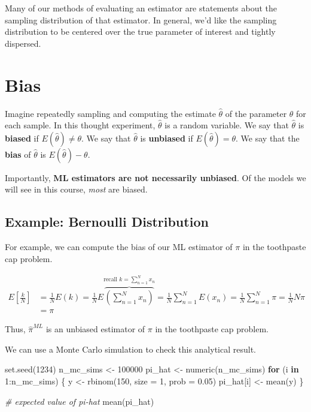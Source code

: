 \documentclass[
]{book}
\newenvironment{Shaded}{\begin{snugshade}}{\end{snugshade}}
\newcommand{\AttributeTok}[1]{\textcolor[rgb]{0.77,0.63,0.00}{#1}}
\newcommand{\CommentTok}[1]{\textcolor[rgb]{0.56,0.35,0.01}{\textit{#1}}}
\newcommand{\ControlFlowTok}[1]{\textcolor[rgb]{0.13,0.29,0.53}{\textbf{#1}}}
\newcommand{\DecValTok}[1]{\textcolor[rgb]{0.00,0.00,0.81}{#1}}
\newcommand{\FloatTok}[1]{\textcolor[rgb]{0.00,0.00,0.81}{#1}}
\newcommand{\FunctionTok}[1]{\textcolor[rgb]{0.00,0.00,0.00}{#1}}
\newcommand{\NormalTok}[1]{#1}
\newcommand{\OtherTok}[1]{\textcolor[rgb]{0.56,0.35,0.01}{#1}}
\newcommand{\SpecialCharTok}[1]{\textcolor[rgb]{0.00,0.00,0.00}{#1}}
\begin{document}
Many of our methods of evaluating an estimator are statements about the
sampling distribution of that estimator. In general, we'd like the
sampling distribution to be centered over the true parameter of interest
and tightly dispersed.

\hypertarget{bias}{%
\section{Bias}\label{bias}}

Imagine repeatedly sampling and computing the estimate \(\hat{\theta}\)
of the parameter \(\theta\) for each sample. In this thought experiment,
\(\hat{\theta}\) is a random variable. We say that \(\hat{\theta}\) is
\textbf{biased} if \(E(\hat{\theta}) \neq \theta\). We say that
\(\hat{\theta}\) is \textbf{unbiased} if \(E(\hat{\theta}) = \theta\).
We say that the \textbf{bias} of \(\hat{\theta}\) is
\(E(\hat{\theta}) - \theta\).

Importantly, \textbf{ML estimators are not necessarily unbiased}. Of the
models we will see in this course, \emph{most} are biased.

\hypertarget{example-bernoulli-distribution-1}{%
\subsection{Example: Bernoulli
Distribution}\label{example-bernoulli-distribution-1}}

For example, we can compute the bias of our ML estimator of \(\pi\) in
the toothpaste cap problem.

\[
\begin{aligned}
E\left[ \frac{k}{N}\right] &= \frac{1}{N} E(k) = \frac{1}{N} E  \overbrace{ \left( \sum_{n = 1}^N x_n \right) }^{\text{recall } k = \sum_{n = 1}^N x_n } = \frac{1}{N} \sum_{n = 1}^N E(x_n) = \frac{1}{N} \sum_{n = 1}^N \pi = \frac{1}{N}N\pi \\
&= \pi
\end{aligned}
\]

Thus, \(\hat{\pi}^{ML}\) is an unbiased estimator of \(\pi\) in the
toothpaste cap problem.

We can use a Monte Carlo simulation to check this analytical result.

\begin{Shaded}
\begin{Highlighting}[]
\FunctionTok{set.seed}\NormalTok{(}\DecValTok{1234}\NormalTok{)}
\NormalTok{n\_mc\_sims }\OtherTok{\textless{}{-}} \DecValTok{100000}
\NormalTok{pi\_hat }\OtherTok{\textless{}{-}} \FunctionTok{numeric}\NormalTok{(n\_mc\_sims)}
\ControlFlowTok{for}\NormalTok{ (i }\ControlFlowTok{in} \DecValTok{1}\SpecialCharTok{:}\NormalTok{n\_mc\_sims) \{}
\NormalTok{  y }\OtherTok{\textless{}{-}} \FunctionTok{rbinom}\NormalTok{(}\DecValTok{150}\NormalTok{, }\AttributeTok{size =} \DecValTok{1}\NormalTok{, }\AttributeTok{prob =} \FloatTok{0.05}\NormalTok{)}
\NormalTok{  pi\_hat[i] }\OtherTok{\textless{}{-}} \FunctionTok{mean}\NormalTok{(y)}
\NormalTok{\}}

\CommentTok{\# expected value of pi{-}hat}
\FunctionTok{mean}\NormalTok{(pi\_hat)}
\end{Highlighting}
\end{Shaded}
\end{document}
